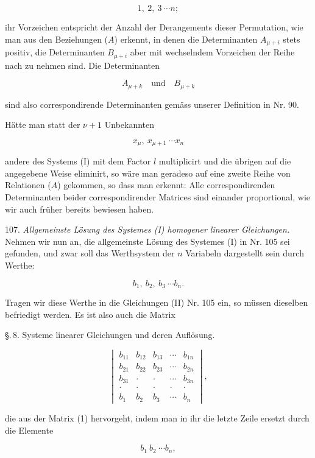 \documentclass[11pt]{article}
\providecommand{\weberpage}[1]{}
\providecommand{\weq}[2]{\begin{equation}\tag{#1}#2\end{equation}}
\begin{document}
\[
1,\ 2,\ 3\ \cdots n;
\]

ihr Vorzeichen entspricht der Anzahl der Derangements dieser Permutation, wie man aus den Beziehungen ($A$) erkennt, in denen die Determinanten $A_{\mu+i}$ stets positiv, die Determinanten $B_{\mu+i}$ aber mit wechselndem Vorzeichen der Reihe nach zu nehmen sind. Die Determinanten

\[
A_{\mu+k}\quad \text{und}\quad B_{\mu+k}
\]

sind also correspondirende Determinanten gem\"ass unserer Definition in Nr. 90.

H\"atte man statt der $\nu+1$ Unbekannten

\[
x_\mu,\ x_{\mu+1}\ \cdots x_n
\]

andere des Systems (I) mit dem Factor $l$ multiplicirt und die \"ubrigen auf die angegebene Weise eliminirt, so w\"are man geradeso auf eine zweite Reihe von Relationen ($A$) gekommen, so dass man erkennt: Alle correspondirenden Determinanten beider correspondirender Matrices sind einander proportional, wie wir auch fr\"uher bereits bewiesen haben.

107. \textit{Allgemeinste L\"osung des Systemes (I) homogener linearer Gleichungen.} Nehmen wir nun an, die allgemeinste L\"osung des Systemes (I) in Nr. 105 sei gefunden, und zwar soll das Werthsystem der $n$ Variabeln dargestellt sein durch Werthe:

\[
b_1,\ b_2,\ b_3\ \cdots b_n.
\]

Tragen wir diese Werthe in die Gleichungen (II) Nr. 105 ein, so m\"ussen dieselben befriedigt werden. Es ist also auch die Matrix


\weberpage{113}
\noindent \S.\,8. Systeme linearer Gleichungen und deren Aufl\"osung.

\weq{3}{
\begin{vmatrix}
b_{11} & b_{12} & b_{13} & \cdots & b_{1n} \\
b_{21} & b_{22} & b_{23} & \cdots & b_{2n} \\
b_{31} & \cdot & \cdot & \cdots & b_{3n} \\
\cdot & \cdot & \cdot & \cdot & \cdot \\
b_1 & b_2 & b_3 & \cdots & b_n
\end{vmatrix},
}

die aus der Matrix (1) hervorgeht, indem man in ihr die letzte Zeile ersetzt durch die Elemente

\[
b_1\ b_2\ \cdots b_n,
\]
\end{document}
